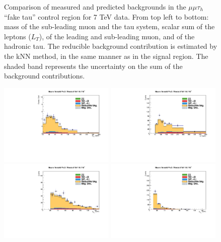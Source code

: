 \begin{figure}
\begin{center}
  \caption{Comparison of measured and predicted backgrounds in the $\mu\mu\tau_h$ ``fake tau'' control region for 7 TeV data.
  From top left to bottom: mass of the sub-leading muon and the tau system, scalar sum of the leptons \pT ($L_T$), \pT of the leading and sub-leading muon, and \pT of the hadronic tau.
  The reducible background contribution is estimated by the kNN method, in the same manner as in the signal region.
  The shaded band represents the uncertainty on the sum of the background contributions.
  }
  \label{fig:LLT_mmt_f3_control_7TeV}
\end{center}
\end{figure}

\begin{figure}
\begin{center}
  \includegraphics[width=0.49\textwidth]{4_Analisys/pics/8TeV/plots/mmt/f3/Full/final-f3-subMass-Full.pdf}
  \includegraphics[width=0.49\textwidth]{4_Analisys/pics/8TeV/plots/mmt/f3/final-LT.pdf}\\
  \includegraphics[width=0.49\textwidth]{4_Analisys/pics/8TeV/plots/mmt/f3/Full/final-f3-m1Pt-Full.pdf}
  \includegraphics[width=0.49\textwidth]{4_Analisys/pics/8TeV/plots/mmt/f3/Full/final-f3-m2Pt-Full.pdf}\\

\end{center}
\end{figure}
